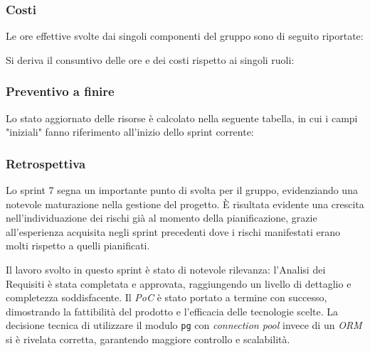 \documentclass[10pt, letterpaper]{article}
\begin{document}
\subsubsection{Costi}
Le ore effettive svolte dai singoli componenti del gruppo sono di seguito riportate:

\setRuoloFilippo{\Amm}
\setRuoloChristian{\Progr}
\setRuoloValeria{\Verif}
\setRuoloGiuseppe{\Amm}
\setRuoloFrancesco{\Verif}
\setRuoloLuca{\Progr}
\setRuoloLeonardo{\Resp}



Si deriva il consuntivo delle ore e dei costi rispetto ai singoli ruoli:

\subsubsection{Preventivo a finire}
Lo stato aggiornato delle risorse è calcolato nella seguente tabella, in cui i campi "iniziali" fanno riferimento all'inizio dello sprint corrente:


\subsubsection{Retrospettiva}
Lo sprint 7 segna un importante punto di svolta per il gruppo, evidenziando una notevole maturazione nella gestione del progetto.
È risultata evidente una crescita nell'individuazione dei rischi già al momento della pianificazione, grazie all'esperienza acquisita negli sprint precedenti
dove i rischi manifestati erano molti rispetto a quelli pianificati.

Il lavoro svolto in questo sprint è stato di notevole rilevanza: l'Analisi dei Requisiti è stata completata e approvata, raggiungendo un livello di dettaglio e
completezza soddisfacente. Il \textit{PoC} è stato portato a termine con successo, dimostrando la fattibilità del prodotto e l'efficacia delle tecnologie scelte.
La decisione tecnica di utilizzare il modulo \texttt{pg} con \textit{connection pool} invece di un \textit{ORM} si è rivelata corretta, garantendo maggiore controllo
e scalabilità.
\end{document}
